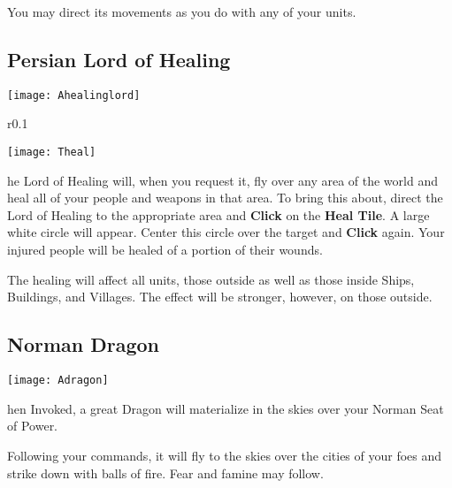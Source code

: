 You may direct its movements as you do with any of your units.

\subsection{Persian Lord of Healing}


\begin{center}
    \texttt{[image: Ahealinglord]}
\end{center}

\begin{wrapfigure}{r}{0.1\textwidth}
    \vspace{-20pt}
    \begin{center}
        \texttt{[image: Theal]}
    \end{center}
    \vspace{-20pt}
\end{wrapfigure}

he Lord of Healing will, when you request it, fly over any area of the world and heal all of your people and weapons in that area. To bring this about, direct the Lord of Healing to the appropriate area and \textbf{Click} on the \textbf{Heal Tile}. A large white circle will appear. Center this circle over the target and \textbf{Click} again. Your injured people will be healed of a portion of their wounds.

The healing will affect all units, those outside as well as those inside Ships, Buildings, and Villages. The effect will be stronger, however, on those outside.

\subsection{Norman Dragon}


\begin{center}
    \texttt{[image: Adragon]}
\end{center}

hen Invoked, a great Dragon will materialize in the skies over your Norman Seat of Power.


Following your commands, it will fly to the skies over the cities of your foes and strike down with balls of fire. Fear and famine may follow.

